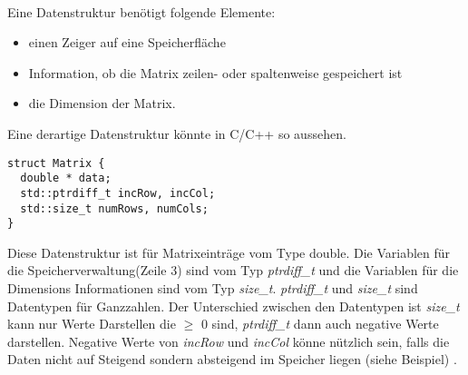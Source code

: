 \\


Eine Datenstruktur benötigt folgende Elemente:
\begin{itemize}
	\item einen Zeiger auf eine Speicherfläche
	\item Information, ob die Matrix zeilen- oder spaltenweise gespeichert ist 
	\item die Dimension der Matrix.
\end{itemize}


Eine derartige Datenstruktur könnte in C/C++ so aussehen.
\begin{lstlisting}
struct Matrix {
  double * data;
  std::ptrdiff_t incRow, incCol;
  std::size_t numRows, numCols;
}
\end{lstlisting}

Diese Datenstruktur ist für Matrixeinträge vom Type double.
Die Variablen für die Speicherverwaltung(Zeile 3) sind vom Typ \textit{ptrdiff\_t} und die Variablen für die Dimensions Informationen sind vom Typ \textit{size\_t}.
\textit{ptrdiff\_t} und \textit{size\_t} sind Datentypen für Ganzzahlen. Der Unterschied zwischen den Datentypen ist \textit{size\_t} kann nur Werte Darstellen die $\geq$ 0 sind, \textit{ptrdiff\_t} dann auch negative Werte darstellen. Negative Werte von \textit{incRow} und \textit{incCol} könne nützlich sein, falls die Daten nicht auf Steigend sondern absteigend im Speicher liegen (siehe Beispiel) \cite{blast}.

